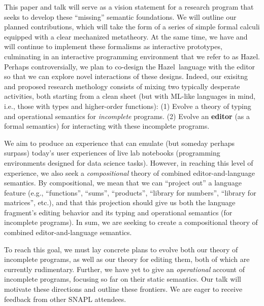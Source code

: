 \documentclass[letterpaper,USenglish]{lipics-v2016}
\newcommand{\Hazel}[0]{\textsf{Hazel}}
\newcommand{\HazelEnv}[0]{\Hazel}
\begin{document}
This paper and talk will serve as a vision statement for a research
program that seeks to develop these ``missing'' semantic foundations.
%
%
We will outline our planned contributions, which will take the form of
a series of simple formal calculi equipped with a clear mechanized
metatheory.
%
At the same time, we have and will continue to implement these
formalisms as interactive prototypes, culminating in an interactive
programming environment that we refer to as \HazelEnv.
%
Perhaps controversially, we plan to co-design the \HazelEnv~language
with the editor so that we can explore novel interactions of these
designs.
%
Indeed, our exisitng and proposed research methology consists of
mixing two typically desperate activities, both starting from a clean
sheet (but with ML-like languages in mind, i.e., those with types and
higher-order functions):
%
(1) Evolve a theory of typing and operational semantics for
  \emph{incomplete} programs.
(2) Evolve an \textbf{editor} (as a formal semantics) for interacting
  with these incomplete programs.

We aim to produce an experience that can emulate (but someday perhaps
surpass) today's user experiences of live lab notebooks (programming
environments designed for data science tasks).
%
However, in reaching this level of experience, we also seek a \emph{compositional} theory of combined editor-and-language semantics.
%
By compositional, we mean that we can ``project out'' a language
feature (e.g., ``functions'', ``sums'', ``products'', ``library for
numbers'', ``library for matrices'', etc.), and that this projection
should give us both the language fragment’s editing behavior and its
typing and operational semantics (for incomplete programs).  In sum,
we are seeking to create a compositional theory of combined
editor-and-language semantics.

To reach this goal, we must lay concrete plans to evolve both our
theory of incomplete programs, as well as our theory for editing them,
both of which are currently rudimentary.
%
Further, we have yet to give an \emph{operational} account of
incomplete programs, focusing so far on their static semantics.
%
Our talk will motivate these directions and outline these frontiers.
%
We are eager to receive feedback from other SNAPL attendees.
\end{document}
